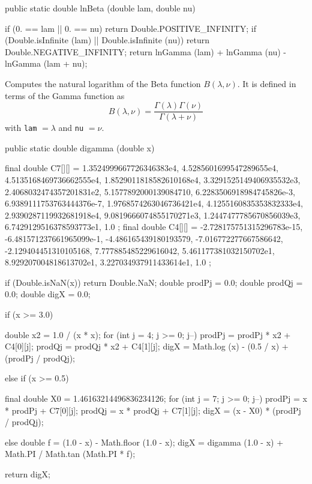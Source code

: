 \begin{code}

   public static double lnBeta (double lam, double nu)\begin{hide} {
      if (0. == lam || 0. == nu)
         return Double.POSITIVE_INFINITY;
      if (Double.isInfinite (lam) || Double.isInfinite (nu))
         return Double.NEGATIVE_INFINITY;
      return lnGamma (lam) + lnGamma (nu) - lnGamma (lam + nu);
   }\end{hide}
\end{code}
\begin{tabb} Computes the natural logarithm of the Beta function
 $B(\lambda, \nu)$.  It is defined in terms of the Gamma function as
 $$
  B(\lambda, \nu) = \frac{\Gamma(\lambda)\Gamma(\nu)}{\Gamma(\lambda + \nu)}
 $$
 with \texttt{lam} $=\lambda$ and  \texttt{nu} $=\nu$.
\end{tabb}
\begin{code}

   public static double digamma (double x)\begin{hide} {
      final double C7[][] = {
       {1.3524999667726346383e4, 4.5285601699547289655e4, 4.5135168469736662555e4,
        1.8529011818582610168e4, 3.3291525149406935532e3, 2.4068032474357201831e2,
        5.1577892000139084710, 6.2283506918984745826e-3},
       {6.9389111753763444376e-7, 1.9768574263046736421e4, 4.1255160835353832333e4,
          2.9390287119932681918e4, 9.0819666074855170271e3,
          1.2447477785670856039e3, 6.7429129516378593773e1, 1.0}
      };
      final double C4[][] = {
       {-2.728175751315296783e-15, -6.481571237661965099e-1, -4.486165439180193579,
        -7.016772277667586642, -2.129404451310105168},
       {7.777885485229616042, 5.461177381032150702e1,
        8.929207004818613702e1, 3.227034937911433614e1, 1.0}
      };

      if (Double.isNaN(x))
         return Double.NaN;
      double prodPj = 0.0;
      double prodQj = 0.0;
      double digX = 0.0;

      if (x >= 3.0) {
         double x2 = 1.0 / (x * x);
         for (int j = 4; j >= 0; j--) {
            prodPj = prodPj * x2 + C4[0][j];
            prodQj = prodQj * x2 + C4[1][j];
         }
         digX = Math.log (x) - (0.5 / x) + (prodPj / prodQj);

      } else if (x >= 0.5) {
         final double X0 = 1.46163214496836234126;
         for (int j = 7; j >= 0; j--) {
            prodPj = x * prodPj + C7[0][j];
            prodQj = x * prodQj + C7[1][j];
         }
         digX = (x - X0) * (prodPj / prodQj);

      } else {
         double f = (1.0 - x) - Math.floor (1.0 - x);
         digX = digamma (1.0 - x) + Math.PI / Math.tan (Math.PI * f);
      }

      return digX;
   }\end{hide}
\end{code}

